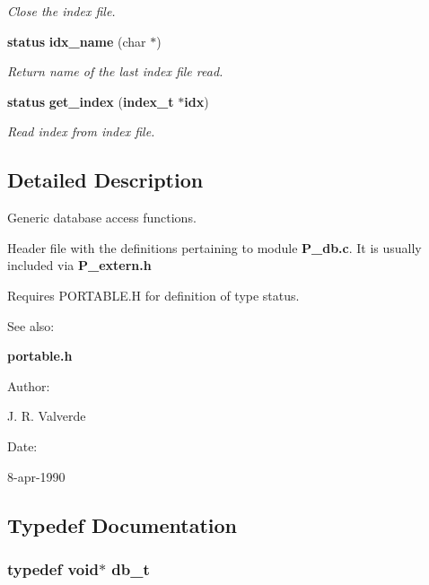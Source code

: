 \begin{CompactItemize}
\begin{CompactList}\small\item\em Close the index file.\item\end{CompactList}\item 
{\bf status} {\bf idx\_\-name} (char $\ast$)
\begin{CompactList}\small\item\em Return name of the last index file read.\item\end{CompactList}\item 
{\bf status} {\bf get\_\-index} ({\bf index\_\-t} $\ast${\bf idx})
\begin{CompactList}\small\item\em Read index from index file.\item\end{CompactList}\end{CompactItemize}


\subsection{Detailed Description}
Generic database access functions.

 

 Header file with the definitions pertaining to module {\bf P\_\-db.c}. It is usually included via {\bf P\_\-extern.h}

Requires PORTABLE.H for definition of type status.

\begin{Desc}
\item[See also: ]\par
{\bf portable.h}\end{Desc}
\begin{Desc}
\item[Author: ]\par
J. R. Valverde  \end{Desc}
\begin{Desc}
\item[Date: ]\par
8-apr-1990\end{Desc}


\subsection{Typedef Documentation}
\subsubsection{\setlength{\rightskip}{0pt plus 5cm}typedef void$\ast$ db\_\-t}\label{P__db_8h_a0}


